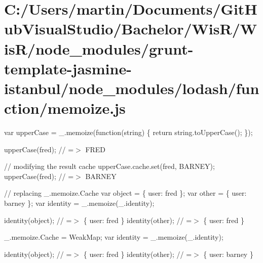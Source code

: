 \hypertarget{_c_1_2_users_2martin_2_documents_2_git_hub_visual_studio_2_bachelor_2_wis_r_2_wis_r_2node_modulee4f94f9e17cf7d482bb87b348b64f5b3}{}\section{C\+:/\+Users/martin/\+Documents/\+Git\+Hub\+Visual\+Studio/\+Bachelor/\+Wis\+R/\+Wis\+R/node\+\_\+modules/grunt-\/template-\/jasmine-\/istanbul/node\+\_\+modules/lodash/function/memoize.\+js}
var upper\+Case = \+\_\+.\+memoize(function(string) \{ return string.\+to\+Upper\+Case(); \});

upper\+Case(\textquotesingle{}fred\textquotesingle{}); // =$>$ \textquotesingle{}F\+R\+E\+D\textquotesingle{}

// modifying the result cache upper\+Case.\+cache.\+set(\textquotesingle{}fred\textquotesingle{}, \textquotesingle{}B\+A\+R\+N\+E\+Y\textquotesingle{}); upper\+Case(\textquotesingle{}fred\textquotesingle{}); // =$>$ \textquotesingle{}B\+A\+R\+N\+E\+Y\textquotesingle{}

// replacing {\ttfamily \+\_\+.\+memoize.\+Cache} var object = \{ \textquotesingle{}user\textquotesingle{}\+: \textquotesingle{}fred\textquotesingle{} \}; var other = \{ \textquotesingle{}user\textquotesingle{}\+: \textquotesingle{}barney\textquotesingle{} \}; var identity = \+\_\+.\+memoize(\+\_\+.\+identity);

identity(object); // =$>$ \{ \textquotesingle{}user\textquotesingle{}\+: \textquotesingle{}fred\textquotesingle{} \} identity(other); // =$>$ \{ \textquotesingle{}user\textquotesingle{}\+: \textquotesingle{}fred\textquotesingle{} \}

\+\_\+.\+memoize.\+Cache = Weak\+Map; var identity = \+\_\+.\+memoize(\+\_\+.\+identity);

identity(object); // =$>$ \{ \textquotesingle{}user\textquotesingle{}\+: \textquotesingle{}fred\textquotesingle{} \} identity(other); // =$>$ \{ \textquotesingle{}user\textquotesingle{}\+: \textquotesingle{}barney\textquotesingle{} \}


